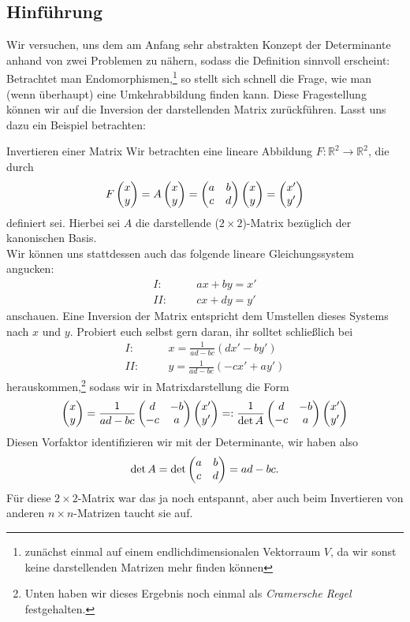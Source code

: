 \subsection{Hinführung}
Wir versuchen, uns dem am Anfang sehr abstrakten Konzept der Determinante anhand von zwei Problemen zu nähern, sodass die Definition sinnvoll erscheint:\\
Betrachtet man Endomorphismen,\footnote{zunächst einmal auf einem endlichdimensionalen Vektorraum $V$, da wir sonst keine darstellenden Matrizen mehr finden können} so stellt sich schnell die Frage, wie man (wenn überhaupt) eine Umkehrabbildung finden kann. Diese Fragestellung können wir auf die Inversion der darstellenden Matrix zurückführen. Lasst uns dazu ein Beispiel betrachten:
\begin{Beispiel}
{Invertieren einer Matrix}
Wir betrachten eine lineare Abbildung $F:\mathbb{R}^2\to\mathbb{R}^2$, die durch
\begin{equation*}
    F\begin{pmatrix}x\\y\end{pmatrix}=A\begin{pmatrix}x\\y\end{pmatrix}=\begin{pmatrix}a&b\\c&d\end{pmatrix}\begin{pmatrix}x\\y\end{pmatrix}=\begin{pmatrix}x'\\y'\end{pmatrix}
\end{equation*}
definiert sei. Hierbei sei $A$ die darstellende ($2\times 2$)-Matrix bezüglich der kanonischen Basis.\\
Wir können uns stattdessen auch das folgende lineare Gleichungssystem angucken:
\begin{eqnarray*}
    I:&\quad&ax+by=x'\\
    II:&\quad&cx+dy=y'
\end{eqnarray*}
anschauen. Eine Inversion der Matrix entspricht dem Umstellen dieses Systems nach $x$ und $y$. Probiert euch selbst gern daran, ihr solltet schließlich bei
\begin{eqnarray*}
I:&\quad& x=\frac{1}{ad-bc}(dx'-by')\\
II:&\quad &y=\frac{1}{ad-bc}(-cx'+ay')
\end{eqnarray*}
herauskommen,\footnote{Unten haben wir dieses Ergebnis noch einmal als \textit{Cramersche Regel} festgehalten.} sodass wir in Matrixdarstellung die Form
\begin{equation*}
    \begin{pmatrix}x\\y\end{pmatrix}=\frac{1}{ad-bc}\begin{pmatrix}d&-b\\-c&a\end{pmatrix}\begin{pmatrix}x'\\y'\end{pmatrix}=:\frac{1}{\det A}\begin{pmatrix}d&-b\\-c&a\end{pmatrix}\begin{pmatrix}x'\\y'\end{pmatrix}
\end{equation*}
Diesen Vorfaktor identifizieren wir mit der Determinante, wir haben also
\begin{equation}
    \det A=\det\begin{pmatrix}a&b\\c&d\end{pmatrix}=ad-bc.
\end{equation}
Für diese $2\times2$-Matrix war das ja noch entspannt, aber auch beim Invertieren von anderen $n\times n$-Matrizen taucht sie auf.
\end{Beispiel}
